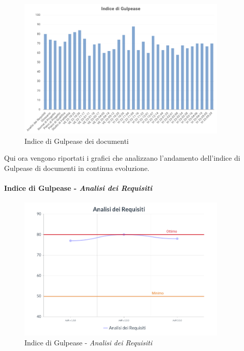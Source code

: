 \begin{center}
\begin{figure}[H]
  \centering
  \renewcommand{\thefigure}{13}
  \includegraphics[width=10cm]{./res/images/GulpeaseGen.png}
  \caption{Indice di Gulpease dei documenti}
  \label{fig:Indice di Gulpease dei documenti}
\end{figure}
\end{center}
\noindent Qui ora vengono riportati i grafici che analizzano l'andamento dell'indice di Gulpease di documenti in continua evoluzione.
\paragraph{Indice di Gulpease - \textit{Analisi dei Requisiti}}
\begin{center}
\begin{figure}[H]
  \centering
  \renewcommand{\thefigure}{14}
  \includegraphics[width=10cm]{./res/images/AdRGraph.png}
  \caption{Indice di Gulpease - \textit{Analisi dei Requisiti}}
  \label{fig:Indice di Gulpease - Analisi dei Requisiti}
\end{figure}
\end{center}
